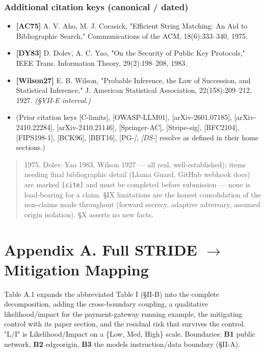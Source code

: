 \subsubsection{Additional citation keys (canonical /
dated)}\label{additional-citation-keys-canonical--dated}

\begin{itemize}
\tightlist
\item
  \textbf{{[}AC75{]}} A. V. Aho, M. J. Corasick, "Efficient String
  Matching: An Aid to Bibliographic Search," Communications of the ACM,
  18(6):333--340, 1975.
\item
  \textbf{{[}DY83{]}} D. Dolev, A. C. Yao, "On the Security of Public
  Key Protocols," IEEE Trans. Information Theory, 29(2):198--208, 1983.
\item
  \textbf{{[}Wilson27{]}} E. B. Wilson, "Probable Inference, the Law of
  Succession, and Statistical Inference," J. American Statistical
  Association, 22(158):209--212, 1927. \emph{(§VII-E interval.)}
\item
  (Prior citation keys {[}C-limits{]}, {[}OWASP-LLM01{]},
  {[}arXiv-2601.07185{]}, {[}arXiv-2410.22284{]},
  {[}arXiv-2410.21146{]}, {[}Springer-AC{]}, {[}Stripe-sig{]},
  {[}RFC2104{]}, {[}FIPS198-1{]}, {[}BCK96{]}, {[}BBT16{]},
  {[}PG-\emph{{]}, {[}DS-}{]} resolve as defined in their home
  sections.)
\end{itemize}

\begin{quote}
1975, Dolev--Yao 1983, Wilson 1927 --- all real, well-established);
items needing final bibliographic detail (Llama Guard, GitHub webhook
docs) are marked \passthrough{\lstinline![cite]!} and must be completed
before submission --- none is load-bearing for a claim. §IX limitations
are the honest consolidation of the non-claims made throughout (forward
secrecy, adaptive adversary, assumed origin isolation). §X asserts no
new facts.
\end{quote}

\section{Appendix A. Full STRIDE $\to$ Mitigation
Mapping}\label{appendix-a-full-stride--mitigation-mapping}

Table A.1 expands the abbreviated Table I (§II-B) into the complete
decomposition, adding the cross-boundary coupling, a qualitative
likelihood/impact for the payment-gateway running example, the
mitigating control with its paper section, and the residual risk that
survives the control. "L/I" is Likelihood/Impact on a \{Low, Med, High\}
scale. Boundaries: \textbf{B1} public network, \textbf{B2} edgeorigin,
\textbf{B3} the model\textquotesingle s instruction/data boundary
(§II-A).

